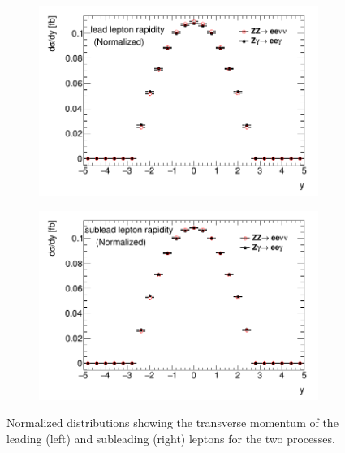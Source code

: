 \documentclass[11pt,a4paper,openright,twoside]{report}
\begin{document}
\begin{figure}[h]
\centering
	\begin{subfigure}{0.49\textwidth}
		\includegraphics[width=\linewidth]{leady.png}
		\caption{}
		\label{fig:leady}
	\end{subfigure}
	\begin{subfigure}{0.49\textwidth}
		\includegraphics[width=\linewidth]{subleady.png}
		\caption{}
		\label{fig:subleady}
	\end{subfigure}
	\caption{Normalized distributions showing the transverse momentum of the leading (left) and subleading (right) leptons for the two processes.}
	\label{fig:leptony}
\end{figure}
\end{document}
